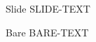 \documentclass{beamer}
\begin{document}
\begin{frame}{Slide}
	SLIDE-TEXT
\end{frame}
\begin{frame}{Bare}
	BARE-TEXT
\end{frame}
\end{document}

